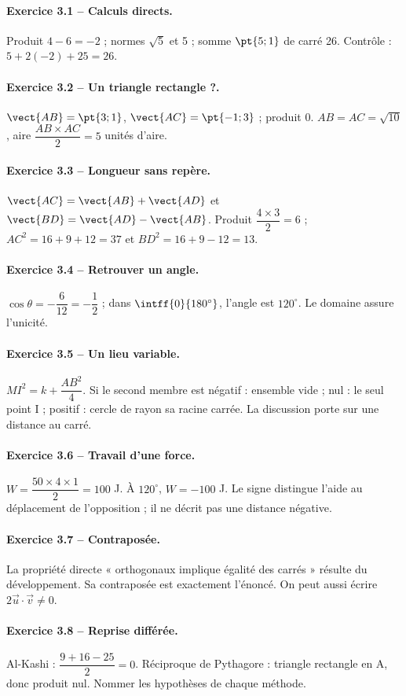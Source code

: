 \paragraph{Exercice 3.1 -- Calculs directs.} Produit $4-6=-2$ ; normes $\sqrt5$ et 5 ; somme $\pt{5;1}$ de carré 26. Contrôle : $5+2(-2)+25=26$.
\paragraph{Exercice 3.2 -- Un triangle rectangle ?.} $\vect{AB}=\pt{3;1}$, $\vect{AC}=\pt{-1;3}$ ; produit 0. $AB=AC=\sqrt{10}$, aire $\dfrac{AB\times AC}{2}=5$ unités d’aire.
\paragraph{Exercice 3.3 -- Longueur sans repère.} $\vect{AC}=\vect{AB}+\vect{AD}$ et $\vect{BD}=\vect{AD}-\vect{AB}$. Produit $\dfrac{4\times 3}{2}=6$ ; $AC^2=16+9+12=37$ et $BD^2=16+9-12=13$.
\paragraph{Exercice 3.4 -- Retrouver un angle.} $\cos \theta =-\dfrac{6}{12}=-\dfrac{1}{2}$ ; dans $\intff{0}{180^\circ}$, l’angle est $120^\circ$. Le domaine assure l’unicité.
\paragraph{Exercice 3.5 -- Un lieu variable.} $MI^2=k+\dfrac{AB^2}{4}$. Si le second membre est négatif : ensemble vide ; nul : le seul point I ; positif : cercle de rayon sa racine carrée. La discussion porte sur une distance au carré.
\paragraph{Exercice 3.6 -- Travail d’une force.} $W=\dfrac{50\times 4\times 1}{2}=100$ J. À $120^\circ$, $W=-100$ J. Le signe distingue l’aide au déplacement de l’opposition ; il ne décrit pas une distance négative.
\paragraph{Exercice 3.7 -- Contraposée.} La propriété directe « orthogonaux implique égalité des carrés » résulte du développement. Sa contraposée est exactement l’énoncé. On peut aussi écrire $2\vec u\cdot\vec v\ne0$.
\paragraph{Exercice 3.8 -- Reprise différée.} Al-Kashi : $\dfrac{9+16-25}{2}=0$. Réciproque de Pythagore : triangle rectangle en A, donc produit nul. Nommer les hypothèses de chaque méthode.

